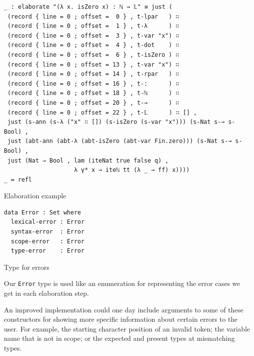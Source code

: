 \begin{listing}[H]
\begin{verbatim}
_ : elaborate "(λ x. isZero x) : ℕ → 𝕃" ≡ just (
 (record { line = 0 ; offset =  0 } , t-lpar   ) ∷
 (record { line = 0 ; offset =  1 } , t-λ      ) ∷
 (record { line = 0 ; offset =  3 } , t-var "x") ∷
 (record { line = 0 ; offset =  4 } , t-dot    ) ∷
 (record { line = 0 ; offset =  6 } , t-isZero ) ∷
 (record { line = 0 ; offset = 13 } , t-var "x") ∷
 (record { line = 0 ; offset = 14 } , t-rpar   ) ∷
 (record { line = 0 ; offset = 16 } , t-:      ) ∷
 (record { line = 0 ; offset = 18 } , t-ℕ      ) ∷
 (record { line = 0 ; offset = 20 } , t-→      ) ∷
 (record { line = 0 ; offset = 22 } , t-𝕃      ) ∷ [] ,
 just (s-ann (s-λ ("x" ∷ []) (s-isZero (s-var "x"))) (s-Nat s-→ s-Bool) ,
 just (abt-ann (abt-λ (abt-isZero (abt-var Fin.zero))) (s-Nat s-→ s-Bool) ,
 just (Nat ⇒ Bool , lam (iteNat true false q) ,
                    λ γ* x → iteℕ tt (λ _ → ff) x))))
_ = refl
\end{verbatim}
\caption{Elaboration example}
\label{code:elab-ex}
\end{listing}

\begin{listing}[H]
\begin{verbatim}
data Error : Set where
  lexical-error : Error
  syntax-error  : Error
  scope-error   : Error
  type-error    : Error
\end{verbatim}
\caption{Type for errors}
\label{code:elab-error}
\end{listing}

Our \verb$Error$ type is used like an enumeration for representing the error cases we get in each elaboration step.

An improved implementation could one day include arguments to some of these constructors for showing more specific information about certain errors to the user. For example, the starting character position of an invalid token; the variable name that is not in scope; or the expected and present types at mismatching types.

